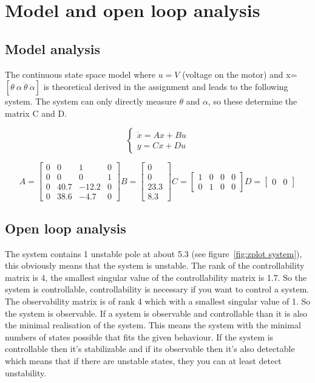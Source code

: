 \section{Model and open loop analysis}
\subsection{Model analysis}
The continuous state space model where $u=V$ (voltage on the motor) and x=$[\theta \ \alpha \  \dot{\theta} \ \dot{\alpha} ]$ is theoretical derived in the assignment and leads to the following system. The system can only directly measure $\theta$ and $\alpha$, so these determine the matrix C and D.

$$
\begin{cases}
\dot{x}=Ax+Bu \\
y=Cx+Du
\end{cases}
$$

$$
A=
\begin{bmatrix}
0 & 0 & 1 & 0 \\
0 & 0 & 0 & 1 \\
0 & 40.7 & -12.2 & 0 \\
0 & 38.6 & -4.7 & 0 
\end{bmatrix}
B=
\begin{bmatrix}
0 \\
0 \\
23.3 \\
8.3
\end{bmatrix}
C=
\begin{bmatrix}
1 & 0 & 0 & 0\\
0 & 1 & 0 & 0
\end{bmatrix}
D=
\begin{bmatrix}
0 & 0
\end{bmatrix}
$$

\subsection{Open loop analysis}

The system contains 1 unstable pole at about 5.3 (see figure~\ref{fig:zplot system}), this obviously means that the system is unstable. The rank of the controllability matrix is 4, the smallest singular value of the controllability matrix is 1.7. So the system is controllable, controllability is necessary if you want to control a system. The observability matrix is of rank 4 which with a smallest singular value of 1. So the system is observable. If a system is observable and controllable than it is also the minimal realisation of the system. This means the system with the minimal numbers of states possible that fits the given behaviour. If the system is controllable then it's stabilizable and if its observable then it's also detectable which means that if there are unstable states, they you can at least detect unstability.

